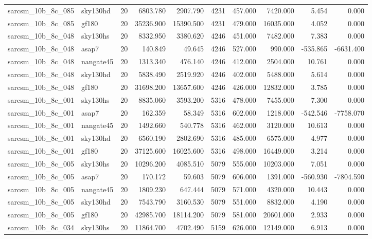 \documentclass{article}
\begin{document}
\begin{longtable}{llrrrrrrrr}
sarcsm\_10b\_8c\_085 & sky130hd & 20 & 6803.780 & 2907.790 & 4231 & 457.000 & 7420.000 & 5.454 & 0.000 \\
sarcsm\_10b\_8c\_085 & gf180 & 20 & 35236.900 & 15390.500 & 4231 & 479.000 & 16035.000 & 4.052 & 0.000 \\
sarcsm\_10b\_8c\_048 & sky130hs & 20 & 8332.950 & 3380.620 & 4246 & 451.000 & 7482.000 & 7.383 & 0.000 \\
sarcsm\_10b\_8c\_048 & asap7 & 20 & 140.849 & 49.645 & 4246 & 527.000 & 990.000 & -535.865 & -6631.400 \\
sarcsm\_10b\_8c\_048 & nangate45 & 20 & 1313.340 & 476.140 & 4246 & 412.000 & 2504.000 & 10.761 & 0.000 \\
sarcsm\_10b\_8c\_048 & sky130hd & 20 & 5838.490 & 2519.920 & 4246 & 402.000 & 5488.000 & 5.614 & 0.000 \\
sarcsm\_10b\_8c\_048 & gf180 & 20 & 31698.200 & 13657.600 & 4246 & 426.000 & 12832.000 & 3.785 & 0.000 \\
sarcsm\_10b\_8c\_001 & sky130hs & 20 & 8835.060 & 3593.200 & 5316 & 478.000 & 7455.000 & 7.300 & 0.000 \\
sarcsm\_10b\_8c\_001 & asap7 & 20 & 162.359 & 58.349 & 5316 & 602.000 & 1218.000 & -542.546 & -7758.070 \\
sarcsm\_10b\_8c\_001 & nangate45 & 20 & 1492.660 & 540.778 & 5316 & 462.000 & 3120.000 & 10.613 & 0.000 \\
sarcsm\_10b\_8c\_001 & sky130hd & 20 & 6560.190 & 2802.690 & 5316 & 485.000 & 6575.000 & 4.977 & 0.000 \\
sarcsm\_10b\_8c\_001 & gf180 & 20 & 37125.600 & 16025.600 & 5316 & 498.000 & 16449.000 & 3.214 & 0.000 \\
sarcsm\_10b\_8c\_005 & sky130hs & 20 & 10296.200 & 4085.510 & 5079 & 555.000 & 10203.000 & 7.051 & 0.000 \\
sarcsm\_10b\_8c\_005 & asap7 & 20 & 170.172 & 59.603 & 5079 & 606.000 & 1391.000 & -560.930 & -7804.590 \\
sarcsm\_10b\_8c\_005 & nangate45 & 20 & 1809.230 & 647.444 & 5079 & 571.000 & 4320.000 & 10.443 & 0.000 \\
sarcsm\_10b\_8c\_005 & sky130hd & 20 & 7543.790 & 3160.530 & 5079 & 551.000 & 8832.000 & 4.190 & 0.000 \\
sarcsm\_10b\_8c\_005 & gf180 & 20 & 42985.700 & 18114.200 & 5079 & 581.000 & 20601.000 & 2.933 & 0.000 \\
sarcsm\_10b\_8c\_034 & sky130hs & 20 & 11864.700 & 4702.490 & 5159 & 626.000 & 12149.000 & 6.913 & 0.000 \\

\end{longtable}
\end{document}
